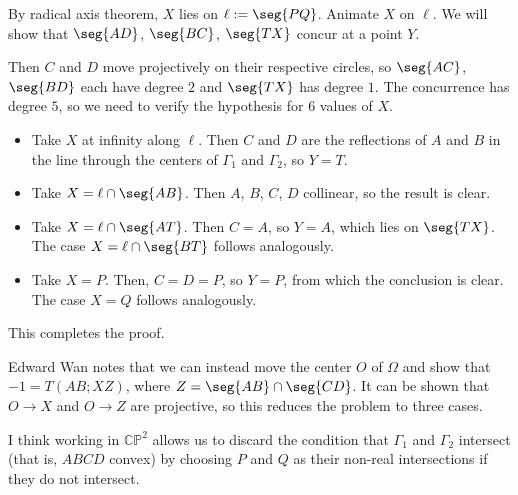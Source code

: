 By radical axis theorem, $X$ lies on $\ell:=\seg{PQ}$. Animate $X$ on $\ell$. We will show that $\seg{AD}$, $\seg{BC}$, $\seg{TX}$ concur at a point $Y$.

Then $C$ and $D$ move projectively on their respective circles, so $\seg{AC}$, $\seg{BD}$ each have degree $2$ and $\seg{TX}$ has degree $1$. The concurrence has degree $5$, so we need to verify the hypothesis for $6$ values of $X$.
\begin{itemize}
    \item Take $X$ at infinity along $\ell$. Then $C$ and $D$ are the reflections of $A$ and $B$ in the line through the centers of $\Gamma_1$ and $\Gamma_2$, so $Y=T$.
    \item Take $X=\ell\cap\seg{AB}$. Then $A$, $B$, $C$, $D$ collinear, so the result is clear.
    \item Take $X=\ell\cap\seg{AT}$. Then $C=A$, so $Y=A$, which lies on $\seg{TX}$. The case $X=\ell\cap\seg{BT}$ follows analogously.
    \item Take $X=P$. Then, $C=D=P$, so $Y=P$, from which the conclusion is clear. The case $X=Q$ follows analogously.
\end{itemize}
This completes the proof.
\begin{remark}
    Edward Wan notes that we can instead move the center $O$ of $\Omega$ and show that $-1=T(AB;XZ)$, where $Z=\seg{AB}\cap\seg{CD}$. It can be shown that $O\to X$ and $O\to Z$ are projective, so this reduces the problem to three cases.
\end{remark}
\begin{remark}
    I think working in $\mathbb C\mathbb P^2$ allows us to discard the condition that $\Gamma_1$ and $\Gamma_2$ intersect (that is, $ABCD$ convex) by choosing $P$ and $Q$ as their non-real intersections if they do not intersect.
\end{remark}

